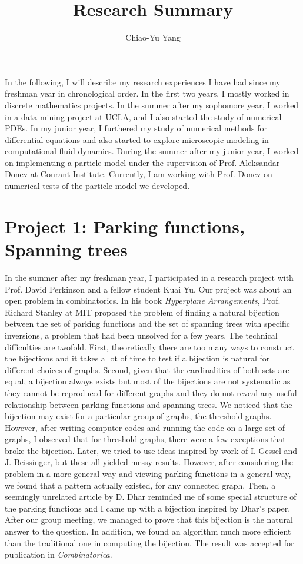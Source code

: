 \documentclass[psamsfonts,reqno]{amsart}
\title{Research Summary}
\author{Chiao-Yu Yang}
\date{}
\theoremstyle{definition}
\begin{document}
\maketitle
In the following, I will describe my research experiences I have had since my freshman year in chronological order. In the first two years, I mostly worked in discrete mathematics projects. In the summer after my sophomore year, I worked in a data mining project at UCLA, and I also started the study of numerical PDEs. In my junior year, I furthered my study of numerical methods for differential equations and also started to explore microscopic modeling in computational fluid dynamics. During the summer after my junior year, I worked on implementing a particle model under the supervision of Prof. Aleksandar Donev at Courant Institute. Currently, I am working with Prof. Donev on numerical tests of the particle model we developed.

\section*{Project 1: Parking functions, Spanning trees}

In the summer after my freshman year, I participated in a research project with Prof. David Perkinson and a fellow student Kuai Yu. Our project was about an open problem in combinatorics. In his book {\textit{Hyperplane Arrangements}}, Prof. Richard Stanley at MIT proposed the problem of finding a natural bijection between the set of parking functions and the set of spanning trees with specific inversions, a problem that had been unsolved for a few years. The technical difficulties are twofold. First, theoretically there are too many ways to construct the bijections and it takes a lot of time to test if a bijection is natural for different choices of graphs. Second, given that the cardinalities of both sets are equal, a bijection always exists but most of the bijections are not systematic as they cannot be reproduced for different graphs and they do not reveal any useful relationship between parking functions and spanning trees. We noticed that the bijection may exist for a particular group of graphs, the threshold graphs. However, after writing computer codes and running the code on a large set of graphs, I observed that for threshold graphs, there were a few exceptions that broke the bijection. Later, we tried to use ideas inspired by work of I. Gessel and J. Beissinger, but these all yielded messy results. However, after considering the problem in a more general way and viewing parking functions in a general way, we found that a pattern actually existed, for any connected graph. Then, a seemingly unrelated article by D. Dhar reminded me of some special structure of the parking functions and I came up with a bijection inspired by Dhar's paper. After our group meeting, we managed to prove that this bijection is the natural answer to the question. In addition, we found an algorithm much more efficient than the traditional one in computing the bijection. The result was accepted for publication in  {\em{Combinatorica}}.
\end{document}
